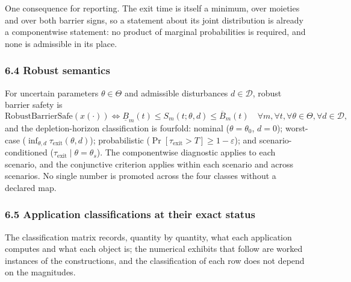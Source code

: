 \documentclass[11pt]{article}
\begin{document}
One consequence for reporting. The exit time is itself a minimum, over moieties and over both barrier
signs, so a statement about its joint distribution is already a componentwise statement: no product
of marginal probabilities is required, and none is admissible in its place.


\subsubsection{6.4 Robust semantics}\label{robust-semantics}

For uncertain parameters \(\theta \in \Theta\) and admissible
disturbances \(d \in \mathcal{D}\), robust barrier safety is
\[\mathrm{RobustBarrierSafe}(x(\cdot)) \iff \underline{B}_m(t) \le S_m(t; \theta, d) \le \overline{B}_m(t) \quad \forall m, \forall t, \forall \theta \in \Theta, \forall d \in \mathcal{D},\]
and the depletion-horizon classification is fourfold: nominal
(\(\theta = \theta_0\), \(d = 0\)); worst-case
(\(\inf_{\theta,d} \tau_{\mathrm{exit}}(\theta,d)\)); probabilistic
(\(\Pr[\tau_{\mathrm{exit}} > T] \ge 1 - \varepsilon\)); and
scenario-conditioned (\(\tau_{\mathrm{exit}} \mid \theta = \theta_s\)).
The componentwise diagnostic applies to each scenario, and the
conjunctive criterion applies within each scenario and across scenarios.
No single number is promoted across the four classes without a declared
map.

\subsubsection{6.5 Application classifications at their exact
status}\label{application-classifications-at-their-exact-status}

The classification matrix records, quantity by quantity, what each
application computes and what each object is; the numerical exhibits
that follow are worked instances of the constructions, and the
classification of each row does not depend on the magnitudes.
\end{document}
